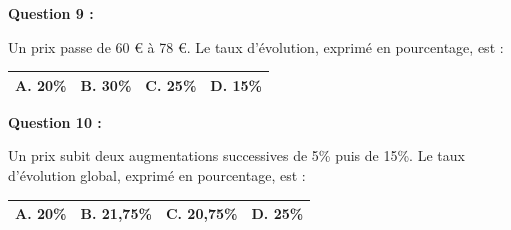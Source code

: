 \documentclass[12pt,a4paper]{article}
\begin{document}
\vspace{0.7cm}

\textbf{Question 9 :}
\vspace{5pt}

Un prix passe de 60 € à 78 €. Le taux d’évolution, exprimé en pourcentage, est :
\vspace{0.3cm}

\renewcommand{\arraystretch}{3}
\begin{tabular}{|m{3.4cm}|m{3.4cm}|m{3.4cm}|m{3.4cm}|}
\hline
\centering \vspace{-0.3cm} \textbf{A.} 20\% & 
\centering \vspace{-0.3cm} \textbf{B.} 30\% & 
\centering \vspace{-0.3cm} \textbf{C.} 25\% & 
\centering \vspace{-0.3cm} \textbf{D.} 15\% \tabularnewline
\hline
\end{tabular}

\vspace{0.7cm}

\textbf{Question 10 :}
\vspace{5pt}

Un prix subit deux augmentations successives de 5\% puis de 15\%. Le taux d’évolution global, exprimé en pourcentage, est :
\vspace{0.3cm}

\renewcommand{\arraystretch}{3}
\begin{tabular}{|m{3.4cm}|m{3.4cm}|m{3.4cm}|m{3.4cm}|}
\hline
\centering \vspace{-0.3cm} \textbf{A.} 20\% & 
\centering \vspace{-0.3cm} \textbf{B.} 21,75\% & 
\centering \vspace{-0.3cm} \textbf{C.} 20,75\% & 
\centering \vspace{-0.3cm} \textbf{D.} 25\% \tabularnewline
\hline
\end{tabular}
\end{document}
